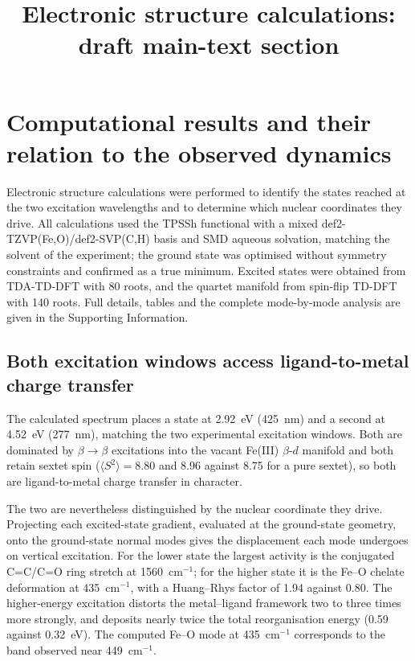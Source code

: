 \documentclass[11pt,a4paper]{article}
\title{\vspace{-2cm}Electronic structure calculations: draft main-text section}
\date{}
\newcommand{\wn}{\ensuremath{\mathrm{cm^{-1}}}}
\begin{document}
\maketitle
\vspace{-1.5cm}

\section{Computational results and their relation to the observed dynamics}

Electronic structure calculations were performed to identify the states reached
at the two excitation wavelengths and to determine which nuclear coordinates
they drive. All calculations used the TPSSh functional with a mixed
def2-TZVP(Fe,O)/def2-SVP(C,H) basis and SMD aqueous solvation, matching the
solvent of the experiment; the ground state was optimised without symmetry
constraints and confirmed as a true minimum. Excited states were obtained from
TDA-TD-DFT with 80 roots, and the quartet manifold from spin-flip TD-DFT with
140 roots. Full details, tables and the complete mode-by-mode analysis are given
in the Supporting Information.

\subsection{Both excitation windows access ligand-to-metal charge transfer}

The calculated spectrum places a state at 2.92~eV (425~nm) and a second at
4.52~eV (277~nm), matching the two experimental excitation windows. Both are
dominated by $\beta \to \beta$ excitations into the vacant Fe(III)
$\beta$-$d$ manifold and both retain sextet spin
($\langle S^2 \rangle = 8.80$ and 8.96 against 8.75 for a pure sextet), so both
are ligand-to-metal charge transfer in character.

The two are nevertheless distinguished by the nuclear coordinate they drive.
Projecting each excited-state gradient, evaluated at the ground-state geometry,
onto the ground-state normal modes gives the displacement each mode undergoes
on vertical excitation. For the lower state the largest activity is the
conjugated C=C/C=O ring stretch at 1560~\wn{}; for the higher state it is the
Fe--O chelate deformation at 435~\wn{}, with a Huang--Rhys factor of 1.94
against 0.80. The higher-energy excitation distorts the metal--ligand framework
two to three times more strongly, and deposits nearly twice the total
reorganisation energy (0.59 against 0.32~eV). The computed Fe--O mode at
435~\wn{} corresponds to the band observed near 449~\wn{}.
\end{document}
